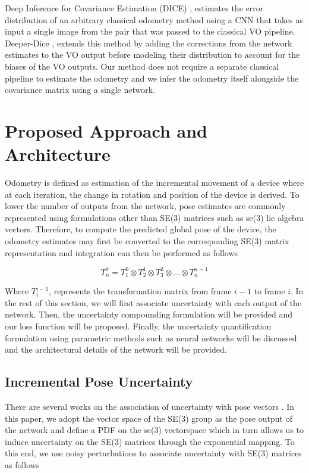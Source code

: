 \documentclass[letterpaper, 10 pt]{ieeeconf}  %
\begin{document}
Deep Inference for Covariance Estimation (DICE) \cite{liu2018deep}, estimates the error distribution of an arbitrary classical odometry method using a CNN that takes as input a single image from the pair that was passed to the classical VO pipeline. Deeper-Dice \cite{maio2020ddice}, extends this method by adding the corrections from the network estimates to the VO output before modeling their distribution to account for the biases of the VO outputs. Our method does not require a separate classical pipeline to estimate the odometry and we infer the odometry itself alongside the covariance matrix using a single network.

\section{Proposed Approach and Architecture}
\label{sec:ourapproach}
Odometry is defined as estimation of the incremental movement of a device where at each iteration, the change in rotation and position of the device is derived. To lower the number of outputs from the network, pose estimates are commonly represented using formulations other than SE(3) matrices such as se(3) lie algebra vectors. Therefore, to compute the predicted global pose of the device, the odometry estimates may first be converted to the corresponding SE(3) matrix representation and integration can then be performed as follows

\begin{equation}
    T^0_n = T^0_1\otimes T^1_2\otimes T^2_3\otimes ...\otimes T^{n-1}_n
    \label{eq:odometryintegration}
\end{equation}

Where $T^{i-1}_{i}$, represents the transformation matrix from frame $i-1$ to frame $i$. In the rest of this section, we will first associate uncertainty with each output of the network. Then, the uncertainty compounding formulation will be provided and our loss function will be proposed. Finally, the uncertainty quantification formulation using parametric methods such as neural networks will be discussed and the architectural details of the network will be provided.

\subsection{Incremental Pose Uncertainty}
\label{sec:posepdf}
There are several works on the association of uncertainty with pose vectors \cite{chirikjian2011stochastic, su1991prop, barfoot2014associating}. In this paper, we adopt the vector space of the SE(3) group as the pose output of the network and define a PDF on the se(3) vectorspace which in turn allows us to induce uncertainty on the SE(3) matrices through the exponential mapping. To this end, we use noisy perturbations \cite{barfoot2014associating} to associate uncertainty with SE(3) matrices as follows
\end{document}
